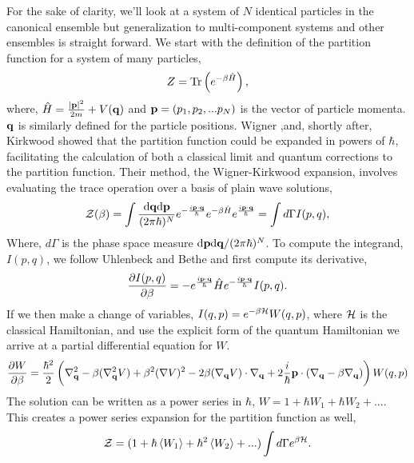 For the sake of clarity, we'll look at a system of $N$ identical particles in the canonical ensemble but generalization to multi-component systems and other ensembles is straight forward. 
We start with the definition of the partition function for a system of many particles,  
%
\begin{equation}
    Z = \mathrm{Tr}\left( e^{-\beta\hat{H}} \right),
\end{equation} 
%
where, $\hat{H} = \frac{\vert\mathbf{p}\vert^2}{2m} + V(\mathbf{q})$ and $\mathbf{p} = (p_1, p_2, ...p_N)$ is the vector of particle momenta. 
$\mathbf{q}$ is similarly defined for the particle positions.
Wigner \cite{PhysRev.40.749},and, shortly after, Kirkwood \cite{PhysRev.44.31} showed that the partition function could be expanded in powers of $\hbar$, facilitating the calculation of both a classical limit and quantum corrections to the partition function.
Their method, the Wigner-Kirkwood expansion, involves evaluating the trace operation over a basis of plain wave solutions,
%
\begin{equation}
	\mathcal{Z}(\beta) = \int 
		\frac{\mathrm{d}\mathbf{q} \mathrm{d}\mathbf{p}}{(2\pi \hbar)^N}
		e^{-\frac{i\mathbf{p}\cdot\mathbf{q}}{\hbar}}
		e^{-\beta \hat{H}}
		e^{\frac{i\mathbf{p}\cdot\mathbf{q}}{\hbar}} = \int d\Gamma I(p, q),
\end{equation}
%
Where, $d\Gamma$ is the phase space measure $\mathrm{d}\mathbf{p}\mathrm{d}\mathbf{q}/(2\pi\hbar)^N$.
To compute the integrand, $I(p, q)$, we follow Uhlenbeck and Bethe \cite{Uhlenbeck1936729} and first compute its derivative,
%
\begin{equation}
	\frac{\partial I(p, q)}{\partial \beta} = -e^{\frac{i\mathbf{p}\cdot\mathbf{q}}{\hbar}}\hat{H}e^{-\frac{i\mathbf{p}\cdot\mathbf{q}}{\hbar}} I(p, q).
\end{equation}
%
If we then make a change of variables, $I(q, p) = e^{-\beta\mathcal{H}}W(q, p)$, where $\mathcal{H}$ is the classical Hamiltonian, and use the explicit form of the quantum Hamiltonian we arrive at a partial differential equation for $W$.
%
\begin{equation}
	\frac{\partial W}{\partial \beta} = \frac{\hbar^2}{2} \left(
		\nabla_{\mathbf{q}}^2 - 
		\beta(\nabla_{\mathbf{q}}^2V) + 
		\beta^2(\nabla V)^2 -
		2\beta(\nabla_{\mathbf{q}} V)\cdot\nabla_{\mathbf{q}} + 
		2 \frac{i}{\hbar}\mathbf{p}\cdot(\nabla_{\mathbf{q}} - \beta\nabla_{\mathbf{q}})
	\right)W(q, p)
\end{equation}
%
The solution can be written as a power series in $\hbar$, $W = 1 + \hbar W_1 + \hbar W_2 + ...$.
This creates a power series expansion for the partition function as well,
%
\begin{equation}
    \mathcal{Z} = (1 + \hbar \left\langle W_1 \right\rangle + \hbar^2 \left\langle W_2 \right\rangle+ ...) 
    \int d\Gamma e^{\beta\mathcal{H}}.
\end{equation}
